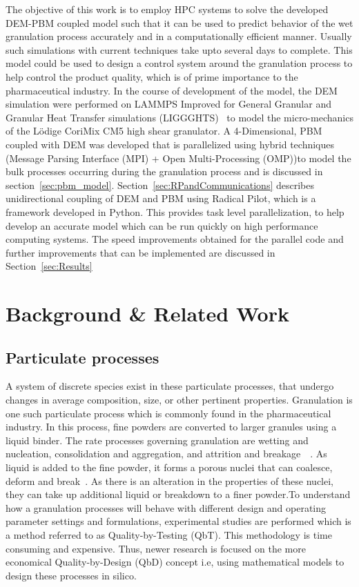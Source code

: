 \documentclass[preprint,11pt,authoryear]{elsarticle}
\begin{document}
The objective of this work is to employ HPC systems to solve the developed DEM-PBM coupled 
model such that it can be used to predict behavior of the wet granulation 
process accurately and in a computationally efficient manner. Usually such simulations with 
current techniques take upto several days to complete. 
This model could be used to design a control system 
around the granulation process to help control the product quality, which is of 
prime importance to the pharmaceutical industry. In the course of
development of the model, the DEM simulation were performed on LAMMPS Improved
for General Granular and Granular Heat Transfer simulations
(LIGGGHTS)~\citep{Kloss2012} to model the micro-mechanics of the L\"{o}dige
CoriMix CM5 high shear granulator. A 4-Dimensional, PBM coupled with DEM 
was developed that is parallelized using hybrid techniques (Message
Parsing Interface (MPI) + Open Multi-Processing (OMP))to model the bulk
processes occurring during the granulation process and is discussed in
section~\ref{sec:pbm_model}. Section~\ref{sec:RPandCommunications} describes
unidirectional coupling of DEM and PBM using Radical Pilot, which is a
framework developed in Python. This provides task level parallelization, to
help develop an accurate model which can be run quickly on high performance
computing systems. The speed improvements obtained for the parallel code and
further improvements that can be implemented are discussed in
Section~\ref{sec:Results}


\section{Background \& Related Work}

\subsection{Particulate processes}
A system of discrete species exist in these particulate processes, 
that undergo changes in average
composition, size, or other pertinent properties. Granulation is one such
particulate process which is commonly found in the pharmaceutical industry. In
this process, fine powders are converted to larger granules using a liquid
binder. The rate processes governing granulation are wetting and
nucleation, consolidation and aggregation, and attrition and
breakage~\citep{Iveson2001}~\citep{Cameron2005}. As liquid is added to the
fine powder, it forms a porous nuclei that can coalesce, deform and
break~\citep{Barrasso2015ces}. As there is an alteration in the properties of
these nuclei, they can take up additional liquid or breakdown to a finer
powder.To understand how a granulation processes will behave with different
design and operating parameter settings and formulations, experimental studies
are performed which is a method referred to as Quality-by-Testing (QbT). This
methodology is time consuming and expensive. Thus, newer research is focused
on the more economical Quality-by-Design (QbD) concept i.e, using mathematical 
models to design these processes in silico.
\end{document}
